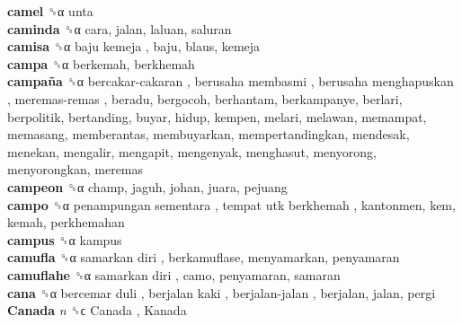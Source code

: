 \textbf{camel} ␝α  unta  \\
\textbf{caminda} ␝α  cara, jalan, laluan, saluran  \\
\textbf{camisa} ␝α   baju kemeja , baju, blaus, kemeja  \\
\textbf{campa} ␝α  berkemah, berkhemah  \\
\textbf{campaña} ␝α   bercakar-cakaran ,  berusaha membasmi ,  berusaha menghapuskan ,  meremas-remas , beradu, bergocoh, berhantam, berkampanye, berlari, berpolitik, bertanding, buyar, hidup, kempen, melari, melawan, memampat, memasang, memberantas, membuyarkan, mempertandingkan, mendesak, menekan, mengalir, mengapit, mengenyak, menghasut, menyorong, menyorongkan, meremas  \\
\textbf{campeon} ␝α  champ, jaguh, johan, juara, pejuang  \\
\textbf{campo} ␝α   penampungan sementara ,  tempat utk berkhemah , kantonmen, kem, kemah, perkhemahan  \\
\textbf{campus} ␝α  kampus  \\
\textbf{camufla} ␝α   samarkan diri , berkamuflase, menyamarkan, penyamaran  \\
\textbf{camuflahe} ␝α   samarkan diri , camo, penyamaran, samaran  \\
\textbf{cana} ␝α   bercemar duli ,  berjalan kaki ,  berjalan-jalan , berjalan, jalan, pergi  \\
\textbf{Canada} \emph{n}  ␝ϲ   Canada ,  Kanada   \\
